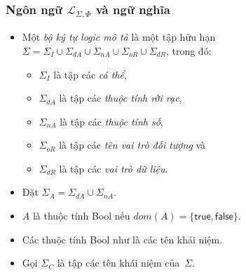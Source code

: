 \documentclass[fleqn]{beamer}
\newcommand{\mL}		{\mathcal{L}}
\newcommand{\SigmaI}	{\Sigma_I}
\newcommand{\SigmaA}	{\Sigma_A}
\newcommand{\SigmaC}	{\Sigma_C}
\newcommand{\SigmaDA}	{\Sigma_{dA}}
\newcommand{\SigmaNA}	{\Sigma_{nA}}
\newcommand{\SigmaOR}	{\Sigma_{oR}}
\newcommand{\SigmaDR}	{\Sigma_{dR}}
\newcommand{\True}		{\mathsf{true}}
\newcommand{\False}		{\mathsf{false}}
\newcommand{\mLSP}		{\mL_{\Sigma,\Phi}}
\newcommand{\Dom}		{\mathit{dom}}
\begin{document}
\begin{frame}\frametitle{\bf Ngôn ngữ $\mLSP$ và ngữ nghĩa}
	\begin{itemize}
		\item Một {\em bộ ký tự logic mô tả} là một tập hữu hạn $\Sigma = \SigmaI \cup \SigmaDA \cup \SigmaNA \cup \SigmaOR \cup \SigmaDR$, trong đó:
		\vspace{1.0ex}
		\begin{itemize}
			\item $\SigmaI$ là tập các {\em cá thể}, 
			\vspace{1.0ex}
			
			\item $\SigmaDA$ là tập các {\em thuộc tính rời rạc}, 
			\vspace{1.0ex}
			
			\item $\SigmaNA$ là tập các {\em thuộc tính số}, 
			\vspace{1.0ex}
			
			\item $\SigmaOR$ là tập các {\em tên vai trò đối tượng} và 
			\vspace{1.0ex}
			
			\item $\SigmaDR$ là tập các {\em vai trò dữ liệu}.
			\vspace{1.0ex}
		\end{itemize}
		
		\item Đặt $\SigmaA = \SigmaDA \cup \SigmaNA$.
		\vspace{1.0ex}
		
		\item $A$ là thuộc tính Bool nếu $\Dom(A) = \{\True,\False\}$. 
		\vspace{1.0ex}
		
		\item Các thuộc tính Bool như là các tên khái niệm. 
		\vspace{1.0ex}
		
		\item Gọi $\SigmaC$ là tập các tên khái niệm của~$\Sigma$.
	\end{itemize}
\end{frame}
\end{document}
